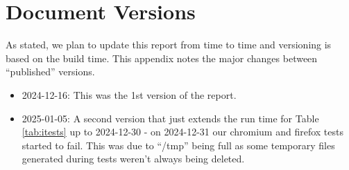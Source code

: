 \section{Document Versions}
\label{app:versions}

As stated, we plan to update this report from time to time and versioning
is based on the build time. This appendix notes the major changes between
``published'' versions.

\begin{itemize}

\item 2024-12-16: This was the 1st version of the report.

\item 2025-01-05: A second version that just extends the run time for Table
    \ref{tab:itests} up to 2024-12-30 - on 2024-12-31 our chromium and firefox
        tests started to fail. This was due to ``/tmp'' being full as some
        temporary files generated during tests weren't always being deleted.

\end{itemize}
